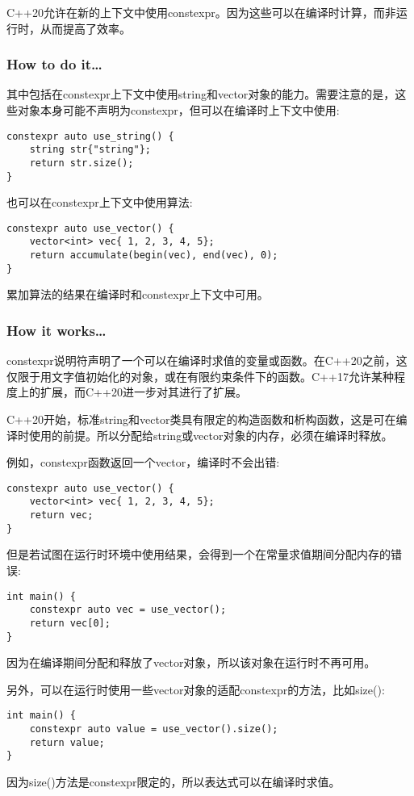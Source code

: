 
C++20允许在新的上下文中使用constexpr。因为这些可以在编译时计算，而非运行时，从而提高了效率。


\subsubsection{How to do it…}

其中包括在constexpr上下文中使用string和vector对象的能力。需要注意的是，这些对象本身可能不声明为constexpr，但可以在编译时上下文中使用:

\begin{lstlisting}[style=styleCXX]
constexpr auto use_string() {
	string str{"string"};
	return str.size();
}
\end{lstlisting}

也可以在constexpr上下文中使用算法:

\begin{lstlisting}[style=styleCXX]
constexpr auto use_vector() {
	vector<int> vec{ 1, 2, 3, 4, 5};
	return accumulate(begin(vec), end(vec), 0);
}
\end{lstlisting}

累加算法的结果在编译时和constexpr上下文中可用。

\subsubsection{How it works…}

constexpr说明符声明了一个可以在编译时求值的变量或函数。在C++20之前，这仅限于用文字值初始化的对象，或在有限约束条件下的函数。C++17允许某种程度上的扩展，而C++20进一步对其进行了扩展。

C++20开始，标准string和vector类具有限定的构造函数和析构函数，这是可在编译时使用的前提。所以分配给string或vector对象的内存，必须在编译时释放。

例如，constexpr函数返回一个vector，编译时不会出错:

\begin{lstlisting}[style=styleCXX]
constexpr auto use_vector() {
	vector<int> vec{ 1, 2, 3, 4, 5};
	return vec;
}
\end{lstlisting}

但是若试图在运行时环境中使用结果，会得到一个在常量求值期间分配内存的错误:

\begin{lstlisting}[style=styleCXX]
int main() {
	constexpr auto vec = use_vector();
	return vec[0];
}
\end{lstlisting}

因为在编译期间分配和释放了vector对象，所以该对象在运行时不再可用。

另外，可以在运行时使用一些vector对象的适配constexpr的方法，比如size():

\begin{lstlisting}[style=styleCXX]
int main() {
	constexpr auto value = use_vector().size();
	return value;
}
\end{lstlisting}

因为size()方法是constexpr限定的，所以表达式可以在编译时求值。












